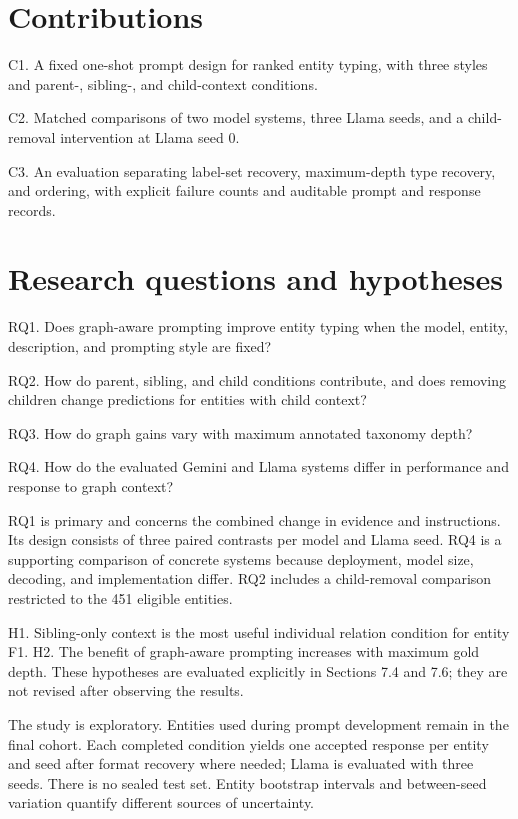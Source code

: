 \FloatBarrier

\section{Contributions}

C1. A fixed one-shot prompt design for ranked entity typing, with three styles and parent-, sibling-, and child-context conditions.


C2. Matched comparisons of two model systems, three Llama seeds, and a child-removal intervention at Llama seed 0.


C3. An evaluation separating label-set recovery, maximum-depth type recovery, and ordering, with explicit failure counts and auditable prompt and response records.


\FloatBarrier

\section{Research questions and hypotheses}

RQ1. Does graph-aware prompting improve entity typing when the model, entity, description, and prompting style are fixed?


RQ2. How do parent, sibling, and child conditions contribute, and does removing children change predictions for entities with child context?


RQ3. How do graph gains vary with maximum annotated taxonomy depth?


RQ4. How do the evaluated Gemini and Llama systems differ in performance and response to graph context?


RQ1 is primary and concerns the combined change in evidence and instructions. Its design consists of three paired contrasts per model and Llama seed. RQ4 is a supporting comparison of concrete systems because deployment, model size, decoding, and implementation differ. RQ2 includes a child-removal comparison restricted to the 451 eligible entities.


H1. Sibling-only context is the most useful individual relation condition for entity F1. H2. The benefit of graph-aware prompting increases with maximum gold depth. These hypotheses are evaluated explicitly in Sections 7.4 and 7.6; they are not revised after observing the results.


The study is exploratory. Entities used during prompt development remain in the final cohort. Each completed condition yields one accepted response per entity and seed after format recovery where needed; Llama is evaluated with three seeds. There is no sealed test set. Entity bootstrap intervals and between-seed variation quantify different sources of uncertainty.


